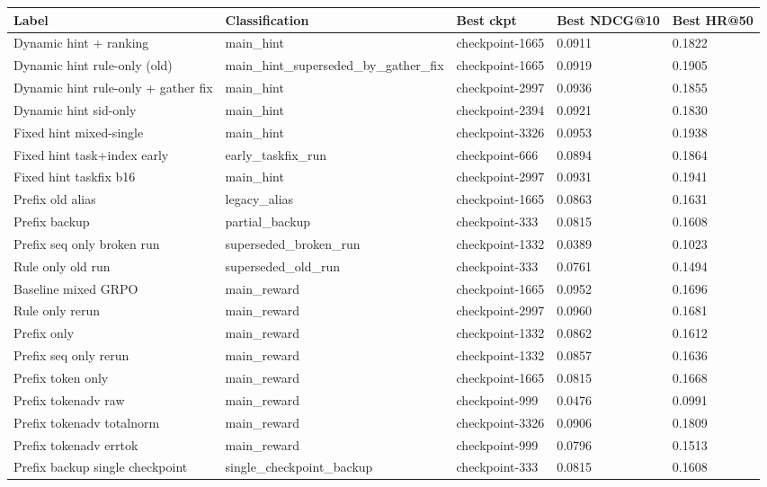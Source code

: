\documentclass[a4paper]{article}
\begin{document}
\begin{longtable}{p{4.0cm}p{3.3cm}p{2.2cm}p{1.6cm}p{1.5cm}}
\toprule
Label & Classification & Best ckpt & Best NDCG@10 & Best HR@50 \\
\midrule
\endhead
Dynamic hint + ranking & main\_hint & checkpoint-1665 & 0.0911 & 0.1822 \\
Dynamic hint rule-only (old) & main\_hint\_superseded\_by\_gather\_fix & checkpoint-1665 & 0.0919 & 0.1905 \\
Dynamic hint rule-only + gather fix & main\_hint & checkpoint-2997 & 0.0936 & 0.1855 \\
Dynamic hint sid-only & main\_hint & checkpoint-2394 & 0.0921 & 0.1830 \\
Fixed hint mixed-single & main\_hint & checkpoint-3326 & 0.0953 & 0.1938 \\
Fixed hint task+index early & early\_taskfix\_run & checkpoint-666 & 0.0894 & 0.1864 \\
Fixed hint taskfix b16 & main\_hint & checkpoint-2997 & 0.0931 & 0.1941 \\
Prefix old alias & legacy\_alias & checkpoint-1665 & 0.0863 & 0.1631 \\
Prefix backup & partial\_backup & checkpoint-333 & 0.0815 & 0.1608 \\
Prefix seq only broken run & superseded\_broken\_run & checkpoint-1332 & 0.0389 & 0.1023 \\
Rule only old run & superseded\_old\_run & checkpoint-333 & 0.0761 & 0.1494 \\
Baseline mixed GRPO & main\_reward & checkpoint-1665 & 0.0952 & 0.1696 \\
Rule only rerun & main\_reward & checkpoint-2997 & 0.0960 & 0.1681 \\
Prefix only & main\_reward & checkpoint-1332 & 0.0862 & 0.1612 \\
Prefix seq only rerun & main\_reward & checkpoint-1332 & 0.0857 & 0.1636 \\
Prefix token only & main\_reward & checkpoint-1665 & 0.0815 & 0.1668 \\
Prefix tokenadv raw & main\_reward & checkpoint-999 & 0.0476 & 0.0991 \\
Prefix tokenadv totalnorm & main\_reward & checkpoint-3326 & 0.0906 & 0.1809 \\
Prefix tokenadv errtok & main\_reward & checkpoint-999 & 0.0796 & 0.1513 \\
Prefix backup single checkpoint & single\_checkpoint\_backup & checkpoint-333 & 0.0815 & 0.1608 \\
\bottomrule
\end{longtable}
\end{document}
